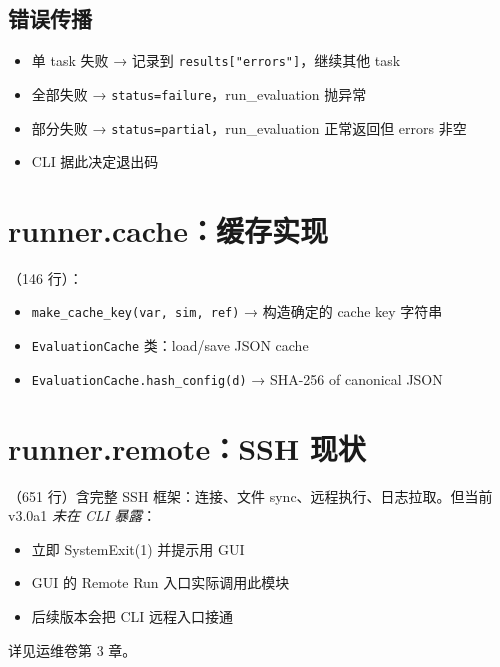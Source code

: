 \subsection{错误传播}

\begin{itemize}
  \item 单 task 失败 → 记录到 \texttt{results["errors"]}，继续其他 task
  \item 全部失败 → \texttt{status=failure}，run\_evaluation 抛异常
  \item 部分失败 → \texttt{status=partial}，run\_evaluation 正常返回但 errors 非空
  \item CLI  据此决定退出码
\end{itemize}

\section{runner.cache：缓存实现}

（146 行）：

\begin{itemize}
  \item \texttt{make\_cache\_key(var, sim, ref)} → 构造确定的 cache key 字符串
  \item \texttt{EvaluationCache} 类：load/save JSON cache
  \item \texttt{EvaluationCache.hash\_config(d)} → SHA-256 of canonical JSON
\end{itemize}


\section{runner.remote：SSH 现状}

（651 行）含完整 SSH 框架：连接、文件 sync、远程执行、日志拉取。但当前 v3.0a1 \emph{未在 CLI 暴露}：

\begin{itemize}
  \item {} 立即 SystemExit(1) 并提示用 GUI
  \item GUI 的 Remote Run 入口实际调用此模块
  \item 后续版本会把 CLI 远程入口接通
\end{itemize}

详见运维卷第 3 章。

